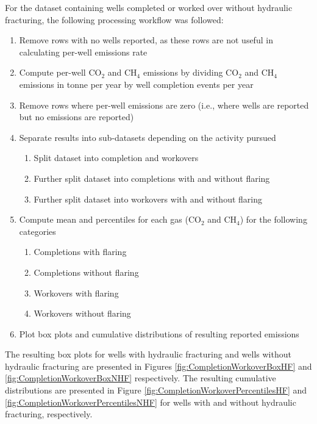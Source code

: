 \documentclass[11pt]{report}
\begin{document}
For the dataset containing wells completed or worked over without hydraulic fracturing, the following processing workflow was followed:
\begin{enumerate}
\item Remove rows with no wells reported, as these rows are not useful in calculating per-well emissions rate	
\item Compute per-well CO$_2$ and CH$_4$ emissions by dividing CO$_2$ and CH$_4$ emissions in tonne per year by well completion events per year	
\item Remove rows where per-well emissions are zero (i.e., where wells are reported but no emissions are reported)	
\item Separate results into sub-datasets depending on the activity pursued	
	\begin{enumerate}
	\item Split dataset into completion and workovers
	\item Further split dataset into completions with and without flaring
	\item Further split dataset into workovers with and without flaring
	\end{enumerate}
\item Compute mean and percentiles for each gas (CO$_2$ and CH$_4$) for the following categories	
	\begin{enumerate}
	\item Completions with flaring
	\item Completions without flaring
	\item Workovers with flaring
	\item Workovers without flaring
	\end{enumerate}
\item Plot box plots and cumulative distributions of resulting reported emissions
\end{enumerate}


The resulting box plots for wells with hydraulic fracturing and wells without hydraulic fracturing are presented in Figures \ref{fig:CompletionWorkoverBoxHF} and \ref{fig:CompletionWorkoverBoxNHF} respectively. The resulting cumulative distributions are presented in Figure \ref{fig:CompletionWorkoverPercentilesHF} and \ref{fig:CompletionWorkoverPercentilesNHF} for wells with  and without hydraulic fracturing, respectively.
\end{document}
